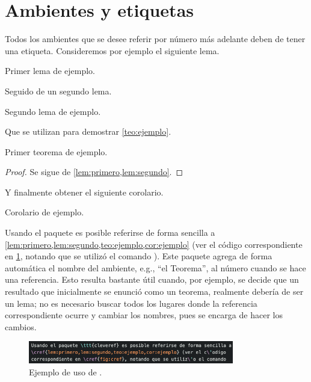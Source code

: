  

\section{Ambientes y etiquetas}
\label{sec:etiquetas}

Todos los ambientes que se desee referir por n\'umero m\'as adelante deben de
tener una etiqueta.  Consideremos por ejemplo el siguiente lema.

\begin{lema}
\label{lem:primero}
Primer lema de ejemplo.
\end{lema}

Seguido de un segundo lema.

\begin{lema}
\label{lem:segundo}
Segundo lema de ejemplo.
\end{lema}

Que se utilizan para demostrar \cref{teo:ejemplo}.

\begin{teorema}
\label{teo:ejemplo}
Primer teorema de ejemplo.
\end{teorema}

\begin{proof}
Se sigue de \cref{lem:primero,lem:segundo}.
\end{proof}

Y finalmente obtener el siguiente corolario.

\begin{corolario}
\label{cor:ejemplo}
Corolario de ejemplo.
\end{corolario}

Usando el paquete \href{http://tug.ctan.org/tex-archive/macros/latex/contrib/%
cleveref/cleveref.pdf}{} es posible referirse de
forma sencilla a \cref{lem:primero,lem:segundo,teo:ejemplo,cor:ejemplo} (ver el
c\'odigo correspondiente en \cref{fig:cref}, notando que se utiliz\'o el comando
).   Este paquete agrega de forma autom\'atica el
nombre del ambiente, e.g., ``el Teorema'', al n\'umero cuando se hace una
referencia.   Esto resulta bastante \'util cuando, por ejemplo, se decide que un
resultado que inicialmente se enunci\'o como un teorema, realmente deber\'ia de
ser un lema; no es necesario buscar todos los lugares donde la referencia
correspondiente ocurre y cambiar los nombres, pues  se encarga de
hacer los cambios.

\begin{figure}[H]
  \centering
  \includegraphics[width=0.8\textwidth]{recursos/capturas/cref}
  \caption{Ejemplo de uso de .}
  \label{fig:cref}
\end{figure}

